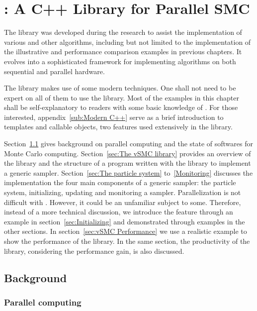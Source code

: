 \chapter[vSMC: A C++ Library for Parallel SMC]
{\protect\vsmc: A C++ Library for Parallel SMC}
\label{cha:vSMC: A C++ Library for Parallel SMC}

The \vsmc library was developed during the research to assist the
implementation of various \smc and other algorithms, including but not limited
to the implementation of the illustrative and performance comparison examples
in previous chapters. It evolves into a sophisticated \cpp framework for
implementing \smc algorithms on both sequential and parallel hardware.

The library makes use of some modern \cpp techniques. One shall not need to be
expert on all of them to use the library. Most of the examples in this chapter
shall be self-explanatory to readers with some basic knowledge of \cpp. For
those interested, appendix~\ref{sub:Modern C++} serve as a brief introduction
to \cpp templates and callable objects, two features used extensively in the
\vsmc library.

Section~\ref{sec:vSMC Background} gives background on parallel computing and
the state of softwares for Monte Carlo computing. Section~\ref{sec:The vSMC
  library} provides an overview of the library and the structure of a program
written with the library to implement a generic \smc sampler.
Section~\ref{sec:The particle system} to~\ref{Monitoring} discusses the
implementation the four main components of a generic \smc sampler: the
particle system, initializing, updating and monitoring a sampler.
Parallelization is not difficult with \vsmc. However, it could be an
unfamiliar subject to some. Therefore, instead of a more technical discussion,
we introduce the feature through an example in section~\ref{sec:Initializing}
and demonstrated through examples in the other sections. In
section~\ref{sec:vSMC Performance} we use a realistic example to show the
performance of the library. In the same section, the productivity of the
library, considering the performance gain, is also discussed.

\section{Background}
\label{sec:vSMC Background}

\subsection{Parallel computing}
\label{sub:Parallel computing}

